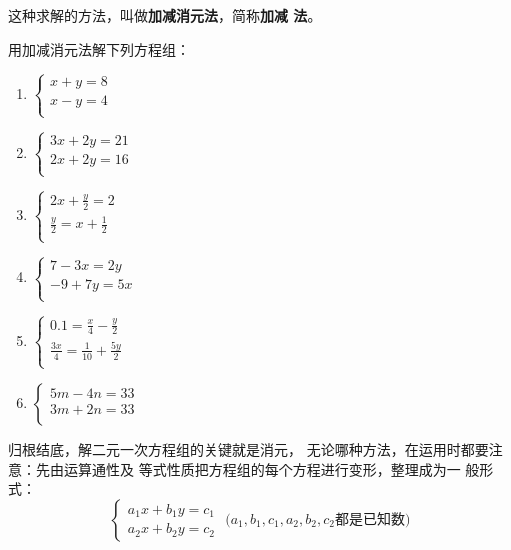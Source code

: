 这种求解的方法，叫做\textbf{加减消元法}，简称\textbf{加减
法}。

\begin{ex}
    用加减消元法解下列方程组：
\begin{multicols}{2}
\begin{enumerate}
    \item $\begin{cases}
        x  +  y  = 8  \\ x  -  y  = 4  \\
    \end{cases}$
    \item $\begin{cases}
       3 x  +  2y  =21   \\ 2x  + 2 y  = 16  \\
    \end{cases}$
    \item $\begin{cases}
       2 x  +  \frac{y}{2}  = 2  \\ \frac{y}{2} =x +\frac{1}{2}       \\
    \end{cases}$
    \item $\begin{cases}
      7- 3 x =2  y    \\ -9+ 7 y  =5x   \\
    \end{cases}$
    \item $\begin{cases}
       0.1=\frac{x}{4} -\frac{y}{2}   \\ \frac{3x}{4}=\frac{1}{10}+\frac{5y}{2}   \\
    \end{cases}$
    \item $\begin{cases}
      5m-4n  = 33  \\3m+2n= 33  \\
    \end{cases}$
\end{enumerate}
\end{multicols}
\end{ex}

归根结底，解二元一次方程组的关键就是消元，
无论哪种方法，在运用时都要注意：先由运算通性及
等式性质把方程组的每个方程进行变形，整理成为一
般形式：
\[\begin{cases}
    a_1x+b_1y=c_1\\
    a_2x+b_2y=c_2
\end{cases} \text{ ($a_1,b_1,c_1,a_2,b_2,c_2$都是已知数)}\]


